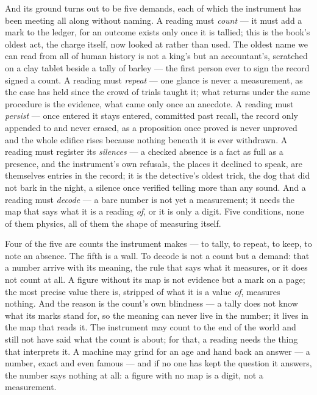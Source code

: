 And its ground turns out to be five demands, each of which the instrument has been meeting all along without
naming. A reading must \emph{count} --- it must add a mark to the ledger, for an outcome exists only once it is
tallied; this is the book's oldest act, the charge itself, now looked at rather than used. The oldest name we can read
from all of human history is not a king's but an accountant's, scratched on a clay tablet beside a tally of
barley --- the first person ever to sign the record signed a count. A reading must \emph{repeat} --- one glance
is never a measurement, as the case has held since the crowd of trials taught it; what returns under the same
procedure is the evidence, what came only once an anecdote. A reading must \emph{persist} --- once entered it
stays entered, committed past recall, the record only appended to and never erased, as a proposition once proved
is never unproved and the whole edifice rises because nothing beneath it is ever withdrawn. A reading must
register its \emph{silences} --- a checked absence is a fact as full as a presence, and the instrument's own
refusals, the places it declined to speak, are themselves entries in the record; it is the detective's oldest
trick, the dog that did not bark in the night, a silence once verified telling more than any sound. And a
reading must \emph{decode} --- a bare number is not yet a measurement; it needs the map that says what it is a
reading \emph{of}, or it is only a digit. Five conditions, none of them physics, all of them the shape of
measuring itself.

Four of the five are counts the instrument makes --- to tally, to repeat, to keep, to note an absence. The
fifth is a wall. To decode is not a count but a demand: that a number arrive with its meaning, the rule that
says what it measures, or it does not count at all. A figure without its map is not evidence but a mark on a
page; the most precise value there is, stripped of what it is a value \emph{of}, measures nothing. And the
reason is the count's own blindness --- a tally does not know what its marks stand for, so the meaning can never
live in the number; it lives in the map that reads it. The instrument may count to the end of the world and
still not have said what the count is about; for that, a reading needs the thing that interprets it. A machine
may grind for an age and hand back an answer --- a number, exact and even famous --- and if no one has kept the
question it answers, the number says nothing at all: a figure with no map is a digit, not a measurement.

